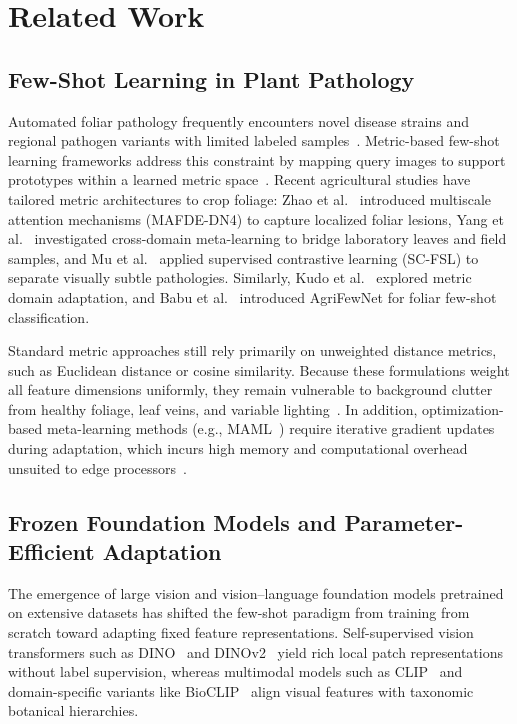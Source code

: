 \documentclass[preprint,12pt]{elsarticle}
\begin{document}

\section{Related Work}
\label{sec:related_work}

\subsection{Few-Shot Learning in Plant Pathology}
Automated foliar pathology frequently encounters novel disease strains and regional pathogen variants with limited labeled samples~\cite{shoaib2023advanced,sun2024few}. Metric-based few-shot learning frameworks address this constraint by mapping query images to support prototypes within a learned metric space~\cite{snell2017prototypical,wang2019simpleshot}. Recent agricultural studies have tailored metric architectures to crop foliage: Zhao et al.~\cite{zhao2024mafde} introduced multiscale attention mechanisms (MAFDE-DN4) to capture localized foliar lesions, Yang et al.~\cite{yang2024laboratory} investigated cross-domain meta-learning to bridge laboratory leaves and field samples, and Mu et al.~\cite{mu2024few} applied supervised contrastive learning (SC-FSL) to separate visually subtle pathologies. Similarly, Kudo et al.~\cite{kudo2025few} explored metric domain adaptation, and Babu et al.~\cite{babu2025agrifewnet} introduced AgriFewNet for foliar few-shot classification.

Standard metric approaches still rely primarily on unweighted distance metrics, such as Euclidean distance or cosine similarity. Because these formulations weight all feature dimensions uniformly, they remain vulnerable to background clutter from healthy foliage, leaf veins, and variable lighting~\cite{yang2024laboratory,kudo2025few}. In addition, optimization-based meta-learning methods (e.g., MAML~\cite{finn2017maml}) require iterative gradient updates during adaptation, which incurs high memory and computational overhead unsuited to edge processors~\cite{babu2025agrifewnet,radocaj2025evolution}.

\subsection{Frozen Foundation Models and Parameter-Efficient Adaptation}
The emergence of large vision and vision--language foundation models pretrained on extensive datasets has shifted the few-shot paradigm from training from scratch toward adapting fixed feature representations. Self-supervised vision transformers such as DINO~\cite{caron2021emerging} and DINOv2~\cite{oquab2023dinov2} yield rich local patch representations without label supervision, whereas multimodal models such as CLIP~\cite{radford2021clip} and domain-specific variants like BioCLIP~\cite{stevens2024bioclip} align visual features with taxonomic botanical hierarchies.
\end{document}
